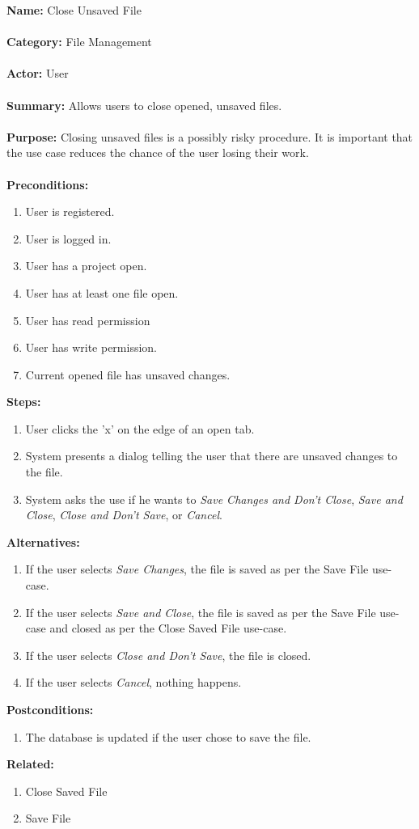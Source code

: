 \documentclass[14pt, a4paper]{article}
\begin{document}
\begin{framed}
	\noindent\textbf{Name:} Close Unsaved File \\ \\
	\textbf{Category:} File Management \\ \\
	\textbf{Actor:} User \\ \\
	\textbf{Summary:} Allows users to close opened, unsaved files. \\ \\
	\textbf{Purpose:} Closing unsaved files is a possibly risky procedure. It is important that the use case reduces the chance of the user losing their work. \\ \\
	\textbf{Preconditions:} 
	\begin{enumerate}
		\item User is registered.
		\item User is logged in.
		\item User has a project open.
		\item User has at least one file open.
		\item User has read permission
		\item User has write permission.
		\item Current opened file has unsaved changes.
	\end{enumerate}		
	\textbf{Steps:}
	\begin{enumerate}
		\item User clicks the 'x' on the edge of an open tab.
		\item System presents a dialog telling the user that there are unsaved changes to the file.
		\item System asks the use if he wants to \textit{Save Changes and Don't Close}, \textit{Save and Close}, \textit{Close and Don't Save}, or \textit{Cancel}.
	\end{enumerate}	
	\textbf{Alternatives:}
	\begin{enumerate}
		\item If the user selects \textit{Save Changes}, the file is saved as per the Save File use-case.
		\item If the user selects \textit{Save and Close}, the file is saved as per the Save File use-case and closed as per the Close Saved File use-case.
		\item If the user selects \textit{Close and Don't Save}, the file is closed.
		\item If the user selects \textit{Cancel}, nothing happens.
	\end{enumerate}
	\textbf{Postconditions:}
	\begin{enumerate}
		\item The database is updated if the user chose to save the file.
	\end{enumerate}
	\textbf{Related:} 
	\begin{enumerate}
		\item Close Saved File
		\item Save File
	\end{enumerate}
\end{framed}
\end{document}
